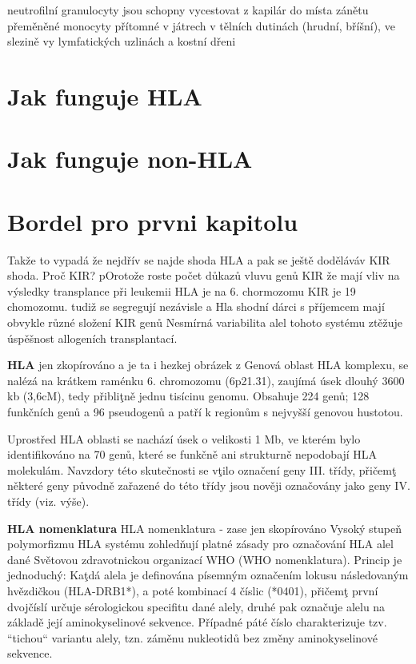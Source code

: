 \documentclass[czech,DP]{thesiskiv}
\begin{document}
neutrofilní granulocyty jsou schopny vycestovat z kapilár do místa zánětu
přeměněné monocyty přítomné v játrech v tělních dutinách (hrudní, bříšní), ve slezině vy lymfatických uzlinách a kostní dřeni
\section{Jak funguje HLA}
\section{Jak funguje non-HLA}

\section{Bordel pro prvni kapitolu}
Takže to vypadá že nejdřív se najde shoda HLA a pak se ještě doděláváv KIR shoda.
Proč KIR? pOrotože roste počet důkazů vluvu genů KIR že mají vliv na výsledky transplance  při leukemii
HLA je na 6. chormozomu KIR je 19 chomozomu. tudiž se segregují nezávisle a Hla shodní dárci s příjemcem mají obvykle různé složení KIR genů
Nesmírná variabilita alel tohoto systému ztěžuje úspěšnost allogeních transplantací. 

\textbf{HLA}
jen zkopírováno a je ta i hezkej obrázek z %
Genová oblast HLA komplexu, se nalézá na krátkem raménku 6. chromozomu (6p21.31), zaujímá úsek dlouhý 3600 kb
(3,6cM), tedy přibliţně jednu tisícinu genomu. Obsahuje 224 genů; 128 funkčních genů
a 96 pseudogenů a patří k regionům s nejvyšší genovou hustotou.

Uprostřed HLA oblasti se nachází úsek o velikosti 1 Mb, ve kterém bylo identifikováno na
70 genů, které se funkčně ani strukturně nepodobají HLA molekulám. Navzdory této
skutečnosti se vţilo označení geny III. třídy, přičemţ některé geny původně zařazené do
této třídy jsou nověji označovány jako geny IV. třídy (viz. výše).

\textbf{HLA nomenklatura}
HLA nomenklatura - zase jen skopírováno
Vysoký stupeň polymorfizmu HLA systému zohledňují platné zásady pro označování HLA
alel dané Světovou zdravotnickou organizací WHO (WHO nomenklatura). Princip je
jednoduchý: Kaţdá alela je definována písemným označením lokusu následovaným
hvězdičkou (HLA-DRB1*), a poté kombinací 4 číslic (*0401), přičemţ první dvojčíslí
určuje sérologickou specifitu dané alely, druhé pak označuje alelu na základě její
aminokyselinové sekvence. Případné páté číslo charakterizuje tzv. “tichou“ variantu alely,
tzn. záměnu nukleotidů bez změny aminokyselinové sekvence.
\end{document}
